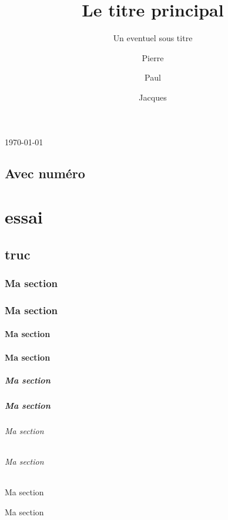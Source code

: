 \documentclass[]{polytech}
\title{Le titre principal}
\subtitle{Un eventuel sous titre}
\author[DI5]{Pierre}{Premier}{pierre.premier@univ-tours.fr}
\author[DI4]{Paul}{Deuxième}{paul2@univ-tours.fr}
\author{Jacques}{Un peu plus Long}{j.unpeupluslong@example.com}
\begin{document}
\maketitle


\today


\lipsum[1-10]

\chapter{Avec numéro}

\part{essai}

\chapter{truc}
\lipsum[1-20]

\section{Ma section}
\lipsum[1-5]

\section{Ma section}
\lipsum[1-5]

\subsection{Ma section}
\lipsum[1-5]
\subsection{Ma section}
\lipsum[1-5]
\subsubsection{Ma section}
\lipsum[1-5]
\subsubsection{Ma section}
\lipsum[1-5]
\paragraph{Ma section}
\lipsum[1-5]
\paragraph{Ma section}
\lipsum[1-5]
\subparagraph{Ma section}
\lipsum[1-5]
\subparagraph{Ma section}
\lipsum[1-5]
\end{document}
